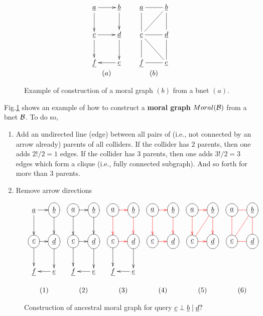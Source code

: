 \begin{figure}[h!]
$$
\begin{array}{ccc}
\xymatrix{
\rva\ar[r]\ar[d]
&{\rvb}\ar[d]
\\
{\rvc}\ar[r]\ar[d]
&{\rvd}\ar[d]
\\
\rvf
&\rve\ar[l]
}
&&
\xymatrix{
\rva\ar@{-}[r]\ar@{-}[d]
&{\rvb}\ar@{-}[d]\ar@{-}[dl]
\\
{\rvc}\ar@{-}[r]\ar@{-}[d]\ar@{-}[dr]
&{\rvd}\ar@{-}[d]
\\
\rvf
&\rve\ar@{-}[l]
}
\\
(a)
&& (b)
\end{array}
$$
\caption{Example of construction of a moral graph $(b)$ from a bnet $(a)$.}
\label{fig-moral-g}
\end{figure}
Fig.\ref{fig-moral-g}
shows an example of how to construct a
{\bf moral graph} $Moral({\cal B})$ from a bnet ${\cal B}$.
To do so,
\begin{enumerate}
\item Add an undirected line (edge) between all
pairs of  (i.e., not connected by an arrow already) parents of all colliders. If the collider
has 2 parents, then one adds $2!/2=1$ edges.
If the collider has 3 parents, then one adds $3!/2=3$ edges which form a clique (i.e.,
fully connected subgraph). And so forth
for more than 3 parents.
\item Remove arrow directions
\end{enumerate}


\begin{figure}
$$
\begin{array}{cccccc}
\xymatrix@C=1pc{
\rva\ar[r]\ar[d]
&\Circle{\rvb}\ar[d]
\\
\Circle{\rvc}\ar[r]\ar[d]
&\Circle{\rvd}\ar[d]
\\
\rvf
&\rve\ar[l]
}
&
\xymatrix@C=1pc{
\Circle{\rva}\ar[r]\ar[d]
&\Circle{\rvb}\ar[d]
\\
\Circle{\rvc}\ar[r]\ar[d]
&\Circle{\rvd}\ar[d]
\\
\rvf
&\rve\ar[l]
}
&
\xymatrix@C=1pc{
\Circle{\rva}\ar@[red][r]\ar@[red][d]
&\Circle{\rvb}\ar@[red][d]
\\
\Circle{\rvc}\ar@[red][r]\ar[d]
&\Circle{\rvd}\ar[d]
\\
\rvf
&\rve\ar[l]
}
&
\xymatrix@C=1pc{
\Circle{\rva}\ar@[red][r]\ar@[red][d]
&\Circle{\rvb}\ar@[red][d]
\\
\Circle{\rvc}\ar@[red][r]
&\Circle{\rvd}
}
&
\xymatrix@C=1pc{
\Circle{\rva}\ar@[red][r]\ar@[red][d]
&\Circle{\rvb}\ar@[red][d]
\ar@[red]@{-}[dl]
\\
\Circle{\rvc}\ar@[red][r]
&\Circle{\rvd}
}
&
\xymatrix@C=1pc{
\Circle{\rva}\ar@{-}@[red][r]\ar@{-}@[red][d]
&\Circle{\rvb}\ar@{-}@[red][d]
\ar@{-}@[red][dl]
\\
\Circle{\rvc}\ar@{-}@[red][r]
&\Circle{\rvd}
}
\\
\\
(1)
&(2)
&(3)
&(4)
&(5)
&(6)
\end{array}
$$
\caption{Construction of ancestral moral graph
for query $\rvc\perp \rvb\mid \rvd?$}
\label{fig-anc-moral-c-b-d}
\end{figure}

